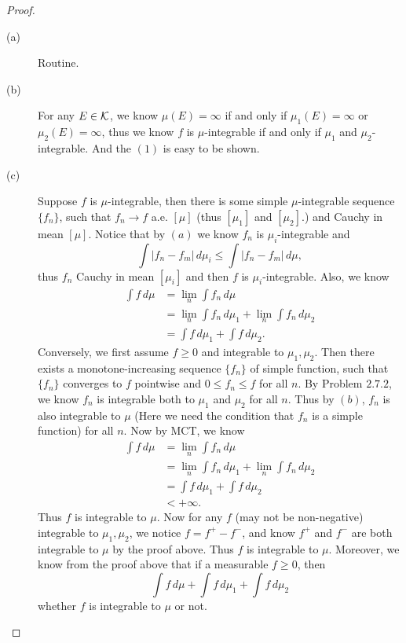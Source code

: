 \begin{proof}
	\begin{description}
	\item[(a)] Routine.
	\item[(b)] For any $E\in\mathcal{K}$, we know $\mu(E)=\infty$ if and only if $\mu_1(E)=\infty$ or $\mu_2(E)=\infty$, thus we know $f$ is $\mu$-integrable if and only if $\mu_1$ and $\mu_2$-integrable. And the $(1)$ is easy to be shown.
	\item[(c)] Suppose $f$ is $\mu$-integrable, then there is some simple $\mu$-integrable sequence $\{f_n\}$, such that $f_n\to f$ a.e. $[\mu]$ (thus $[\mu_1]$ and $[\mu_2]$.) and Cauchy in mean $[\mu]$. Notice that by $(a)$ we know $f_n$ is $\mu_i$-integrable and
	\[\int |f_n-f_m|\,d\mu_i\leq \int |f_n-f_m|\,d\mu,\]thus $f_n$ Cauchy in mean $[\mu_i]$ and then $f$ is $\mu_i$-integrable. Also, we know
	\begin{align*}
	\int f\,d\mu&=\lim_n \int f_n\,d\mu\\
				&=\lim_n \int f_n\,d\mu_1+\lim_n \int f_n\,d\mu_2\\
				&=\int f\,d\mu_1+\int f\,d\mu_2.
	\end{align*}
	Conversely, we first assume $f\geq 0$ and integrable to $\mu_1,\mu_2$. Then there exists a monotone-increasing sequence $\{f_n\}$ of simple function, such that $\{f_n\}$ converges to $f$ pointwise and $0\leq f_n\leq f$ for all $n$. By Problem $2.7.2$, we know $f_n$ is integrable both to $\mu_1$ and $\mu_2$ for all $n$. Thus by $(b)$, $f_n$ is also integrable to $\mu$ (Here we need the condition that $f_n$ is a simple function) for all $n$.
	Now by MCT, we know
	\begin{align*}
	\int f\,d\mu&=\lim_n \int f_n\,d\mu\\
	&=\lim_n \int f_n\,d\mu_1+\lim_n \int f_n\,d\mu_2\\
	&=\int f\,d\mu_1+\int f\,d\mu_2\\
	&<+\infty.
	\end{align*}
	Thus $f$ is integrable to $\mu$. Now for any $f$ (may not be non-negative) integrable to $\mu_1,\mu_2$, we notice $f=f^+-f^-$, and know $f^+$ and $f^-$ are both integrable to $\mu$ by the proof above. Thus $f$ is integrable to $\mu$. Moreover, we know from the proof above that if a measurable $f\geq 0$, then
	\[\int f\,d\mu+\int f\,d\mu_1+\int f\,d\mu_2\]
	whether $f$ is integrable to $\mu$ or not.
	\end{description}
\end{proof}

